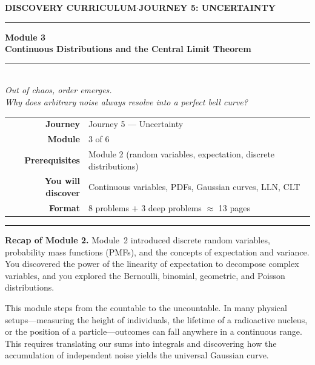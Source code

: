 \documentclass[12pt, a4paper]{article}
\newcounter{problem}
\begin{document}
\thispagestyle{empty}
\begin{center}
{\small\color{MidBlue}\textbf{DISCOVERY CURRICULUM}\quad$\cdot$\quad\textbf{JOURNEY 5: UNCERTAINTY}}
\vspace{0.6cm}

{\color{NavyBlue}\rule{\linewidth}{2pt}}\vspace{0.5cm}

{\Huge\bfseries\color{NavyBlue}Module 3}\\[0.3cm]
{\LARGE\bfseries\color{MidBlue}Continuous Distributions and the Central Limit Theorem}\\[0.4cm]
{\color{Gold}\rule{0.4\linewidth}{1.2pt}}\\[0.4cm]
{\large\itshape\color{DarkGrey}
Out of chaos, order emerges.\\[0.15cm]
Why does arbitrary noise always resolve into a perfect bell curve?}

\vspace{1cm}
\begin{tabular}{rl}
\color{DarkGrey}\textbf{Journey}           & Journey 5 --- Uncertainty \\[4pt]
\color{DarkGrey}\textbf{Module}            & 3 of 6 \\[4pt]
\color{DarkGrey}\textbf{Prerequisites}     & Module 2 (random variables, expectation, discrete distributions) \\[4pt]
\color{DarkGrey}\textbf{You will discover} & Continuous variables, PDFs, Gaussian curves, LLN, CLT \\[4pt]
\color{DarkGrey}\textbf{Format}            & 8 problems $+$ 3 deep problems $\approx$ 13 pages \\
\end{tabular}
\vspace{1cm}

{\color{NavyBlue}\rule{\linewidth}{2pt}}
\end{center}

\vspace{0.5cm}
\noindent\textbf{Recap of Module 2.}
Module~2 introduced discrete random variables, probability mass functions (PMFs), and the concepts of expectation and variance. You discovered the power of the linearity of expectation to decompose complex variables, and you explored the Bernoulli, binomial, geometric, and Poisson distributions.

\medskip
This module steps from the countable to the uncountable. In many physical setups—measuring the height of individuals, the lifetime of a radioactive nucleus, or the position of a particle—outcomes can fall anywhere in a continuous range. This requires translating our sums into integrals and discovering how the accumulation of independent noise yields the universal Gaussian curve.
\end{document}
